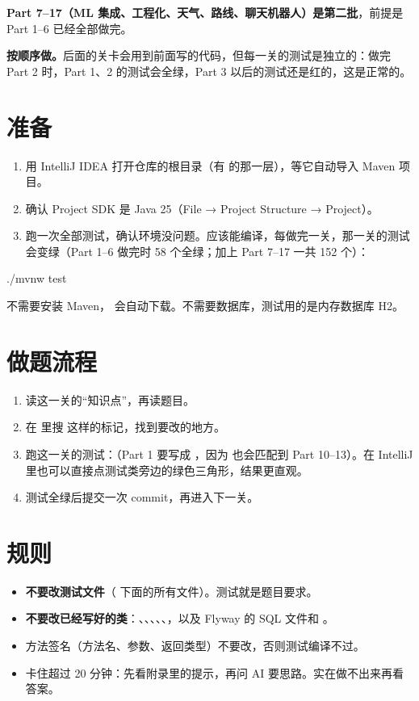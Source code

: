\textbf{Part 7--17（ML 集成、工程化、天气、路线、聊天机器人）是第二批}，前提是 Part 1--6 已经全部做完。

\textbf{按顺序做。}后面的关卡会用到前面写的代码，但每一关的测试是独立的：做完 Part 2 时，Part 1、2 的测试会全绿，Part 3 以后的测试还是红的，这是正常的。

\section*{准备}

\begin{enumerate}
  \item 用 IntelliJ IDEA 打开仓库的根目录（有  的那一层），等它自动导入 Maven 项目。
  \item 确认 Project SDK 是 Java 25（File → Project Structure → Project）。
  \item 跑一次全部测试，确认环境没问题。应该能编译，每做完一关，那一关的测试会变绿（Part 1--6 做完时 58 个全绿；加上 Part 7--17 一共 152 个）：
\end{enumerate}

\begin{shell}
./mvnw test
\end{shell}

不需要安装 Maven， 会自动下载。不需要数据库，测试用的是内存数据库 H2。

\section*{做题流程}

\begin{enumerate}
  \item 读这一关的“知识点”，再读题目。
  \item 在  里搜  这样的标记，找到要改的地方。
  \item 跑这一关的测试：（Part 1 要写成 ，因为  也会匹配到 Part 10--13）。在 IntelliJ 里也可以直接点测试类旁边的绿色三角形，结果更直观。
  \item 测试全绿后提交一次 commit，再进入下一关。
\end{enumerate}

\section*{规则}

\begin{itemize}
  \item \textbf{不要改测试文件}（ 下面的所有文件）。测试就是题目要求。
  \item \textbf{不要改已经写好的类}：、、、、、，以及 Flyway 的 SQL 文件和 。
  \item 方法签名（方法名、参数、返回类型）不要改，否则测试编译不过。
  \item 卡住超过 20 分钟：先看附录里的提示，再问 AI 要思路。实在做不出来再看答案。
\end{itemize}

